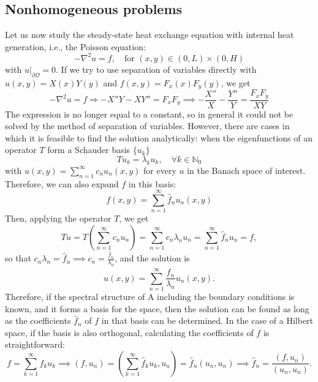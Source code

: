 \subsection{Nonhomogeneous problems}
Let us now study the steady-state heat exchange equation with internal heat generation, i.e., the Poisson equation:
\begin{equation*}
    -\nabla^{2}u=f, \quad \text{for }(x,y)\in(0,L)\times(0,H)
\end{equation*}
with $u|_{\partial\Omega}=0$. If we try to use separation of variables directly with $u(x,y)=X(x)Y(y)$ and $f(x,y)=F_{x}(x)F_{y}(y)$, we get
\begin{equation*}
    -\nabla^{2}u=f\Rightarrow-X''Y-XY''=F_{x}F_{y} \implies -\frac{X''}{X}-\frac{Y''}{Y}=\frac{F_{x}F_{y}}{XY}
\end{equation*}
The expression is no longer equal to a constant, so in general it could not be solved by the method of separation of variables. However, there are cases in which it is feasible to find the solution analytically: when the eigenfunctions of an operator $T$ form a Schauder basis $\{u_k\}$
\begin{equation*}
    T u_{k}=\lambda_{k}u_{k}, \quad \forall k\in\mathbb{N}_0
\end{equation*}
with $u(x,y)=\sum_{n=1}^{\infty}c_{n}u_{n}(x,y)$ for every $u$ in the Banach space of interest. Therefore, we can also expand $f$ in this basis:
\begin{equation*}
    f(x,y)=\sum_{n=1}^{\infty}\hat{f}_{n}u_{n}(x,y)
\end{equation*}
Then, applying the operator $T$, we get
\begin{equation*}
    T u = T\left(\sum_{n=1}^{\infty}c_{n}u_{n}\right)=\sum_{n=1}^{\infty}c_{n}\lambda_{n}u_{n}=\sum_{n=1}^{\infty}\hat{f}_{n}u_{n}=f,
\end{equation*}
so that $c_{n}\lambda_{n}=\hat{f}_{n} \implies c_{n}=\frac{\hat{f}_{n}}{\lambda_{n}}$, and the solution is
\begin{equation*}
    u(x,y)=\sum_{n=1}^{\infty}\frac{\hat{f}_{n}}{\lambda_{n}}u_{n}(x,y).
\end{equation*}
Therefore, if the spectral structure of A including the boundary conditions is known, and it forms a basis for the space, then the solution can be found as long as the coefficients $\hat{f}_n$ of $f$ in that basis can be determined. In the case of a Hilbert space, if the basis is also orthogonal, calculating the coefficients of $f$ is straightforward: 
\begin{equation*}
    f=\sum_{k=1}^{\infty}\hat{f}_{k}u_{k}\implies(f,u_{n})=\left(\sum_{k=1}^{\infty}\hat{f}_{k}u_{k},u_{n}\right)=\hat{f}_{n}(u_{n},u_{n}) \implies\hat{f}_{n}=\frac{(f,u_{n})}{(u_{n},u_{n})}.
\end{equation*}
